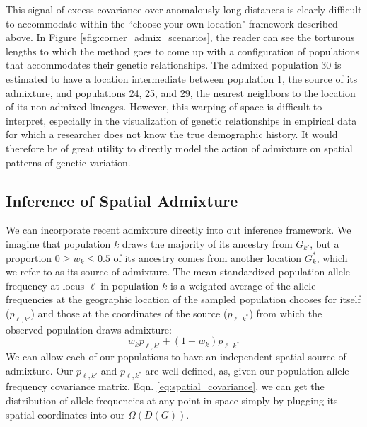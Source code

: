\documentclass[12pt]{article}
\newcommand{\kadmixsource}[1]{{$G^{*}_{#1}$}}
\newcommand{\identifyadmixsource}[1]{{#1^{*}}}
\begin{document}
This signal of excess covariance over anomalously long distances is clearly difficult to accommodate within the ``choose-your-own-location" framework described above.  In Figure \ref{sfig:corner_admix_scenarios}, the reader can see the torturous lengths to which the method goes to come up with a configuration of populations that accommodates their genetic relationships.  The admixed population 30 is estimated to have a location intermediate between population 1, the source of its admixture, and populations 24, 25, and 29, the nearest neighbors to the location of its non-admixed lineages.  However, this warping of space is difficult to interpret, especially in the visualization of genetic relationships in empirical data for which a researcher does not know the true demographic history.  It would therefore be of great utility to directly model the action of admixture on spatial patterns of genetic variation.

\subsection*{Inference of Spatial Admixture}
We can incorporate recent admixture directly into out inference framework.  We imagine that population $k$ draws the majority of its ancestry from $G_{k'}$, but a proportion $0 \geq w_k \leq 0.5$ of its ancestry comes from another location \kadmixsource{k}, which we refer to as its source of admixture. The mean standardized population allele frequency at locus $\ell$ in population $k$ is a weighted average of the allele frequencies at the geographic location of the sampled population chooses for itself ($p_{\ell,k'}$) and those at the coordinates of the source ($p_{\ell,\identifyadmixsource{k}}$) from which the observed population draws admixture:
\begin{equation}
w_k p_{\ell,k'} + (1-w_k) p_{\ell,\identifyadmixsource{k}} \label{eqn-admixedfreq}
\end{equation}
We can allow each of our populations to have an independent spatial source of admixture. Our $p_{\ell,k'}$ and $p_{\ell,\identifyadmixsource{k}} $ are well defined, as, given our population allele frequency covariance matrix, Eqn. \ref{eq:spatial_covariance}, we can get the distribution of allele frequencies at any point in space simply by plugging its spatial coordinates into our $\Omega(D(G))$.
\end{document}
